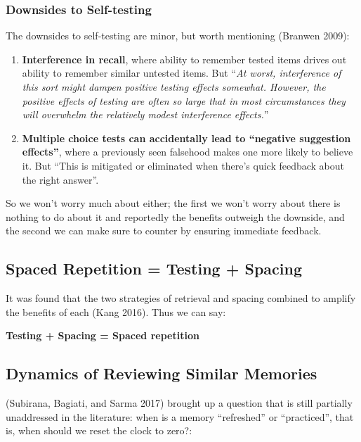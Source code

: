 \subsubsection{Downsides to
Self-testing}\label{downsides-to-self-testing}

The downsides to self-testing are minor, but worth mentioning (Branwen
2009):

\begin{enumerate}
\def\labelenumi{\arabic{enumi}.}
\tightlist
\item
  \textbf{Interference in recall}, where ability to remember tested
  items drives out ability to remember similar untested items. But
  ``\emph{At worst, interference of this sort might dampen positive
  testing effects somewhat. However, the positive effects of testing are
  often so large that in most circumstances they will overwhelm the
  relatively modest interference effects.}''
\item
  \textbf{Multiple choice tests can accidentally lead to ``negative
  suggestion effects''}, where a previously seen falsehood makes one
  more likely to believe it. But ``This is mitigated or eliminated when
  there's quick feedback about the right answer''.
\end{enumerate}

So we won't worry much about either; the first we won't worry about
there is nothing to do about it and reportedly the benefits outweigh the
downside, and the second we can make sure to counter by ensuring
immediate feedback.

\subsection{Spaced Repetition = Testing +
Spacing}\label{spaced-repetition-testing-spacing}

It was found that the two strategies of retrieval and spacing combined
to amplify the benefits of each (Kang 2016). Thus we can say:

\textbf{Testing + Spacing = Spaced repetition}

\subsection{Dynamics of Reviewing Similar
Memories}\label{dynamics-of-reviewing-similar-memories}

(Subirana, Bagiati, and Sarma 2017) brought up a question that is still
partially unaddressed in the literature: when is a memory ``refreshed''
or ``practiced'', that is, when should we reset the clock to zero?:

